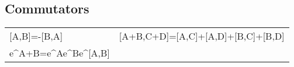\subsection*{Commutators}
\begin{table}
    \centering
    \begin{tabular}{LL}
        [A,B]=-[B,A]&[A+B,C+D]=[A,C]+[A,D]+[B,C]+[B,D]\\
        e^{A+B}=e^Ae^Be^{[A,B]}&
    \end{tabular}
\end{table}